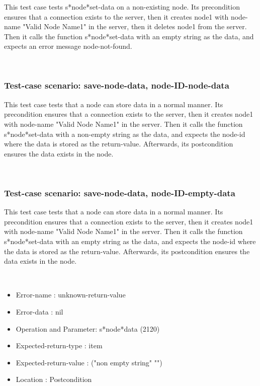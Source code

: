 This test case tests s*node*set-data on a non-existing node.
Its precondition ensures that a connection exists to the server, then it creates node1 with node-name "Valid Node Name1" in the server, then it deletes node1 from the server.
Then it calls the function s*node*set-data  with an empty string as the data, and expects an error message node-not-found.





\
\subsubsection {Test-case scenario: save-node-data, node-ID-node-data}


This test case tests that a node can store data in a normal manner.
Its precondition ensures that a connection exists to the server, then it creates node1 with node-name "Valid Node Name1" in the server.
Then it calls the function s*node*set-data  with a non-empty string as the data, and expects the node-id where the data is stored as the return-value.
Afterwards, its postcondition ensures the data exists in the node.




\
\subsubsection {Test-case scenario: save-node-data, node-ID-empty-data}


This test case tests that a node can store data in a normal manner.
Its precondition ensures that a connection exists to the server, then it creates node1 with node-name "Valid Node Name1" in the server.
Then it calls the function s*node*set-data  with an empty string as the data, and expects the node-id where the data is stored as the return-value.
Afterwards, its postcondition ensures the data exists in the node.


\
\begin {itemize}
\item 	Error-name             : unknown-return-value
\item Error-data             : nil
\item Operation and Parameter: s*node*data (2120)
\item Expected-return-type   : item
\item Expected-return-value  : ("non empty string" "")
\item Location               : Postcondition



\end {itemize}
